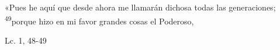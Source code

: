 \documentclass[../../rosario.tex]{subfiles}
\begin{document}
    «Pues he aquí que desde ahora me llamarán dichosa todas las generaciones; \textsuperscript{49}porque hizo en mi favor grandes cosas el Poderoso,
    \begin{flushright}
    Lc. 1, 48-49          
    \end{flushright}
\end{document}
